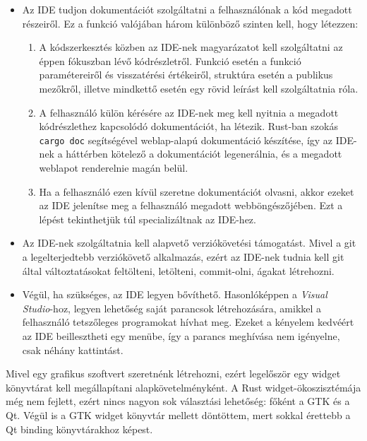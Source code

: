 \begin{itemize}
	\item Az IDE tudjon dokumentációt szolgáltatni a felhasználónak a kód megadott részeiről. 
	Ez a funkció valójában három különböző szinten kell, hogy létezzen:
	\begin{enumerate}
		\item A kódszerkesztés közben az IDE-nek magyarázatot kell szolgáltatni az éppen fókuszban lévő kódrészletről. 
		Funkció esetén a funkció paramétereiről és visszatérési értékeiről, struktúra esetén a publikus mezőkről, illetve mindkettő esetén egy rövid leírást kell szolgáltatnia róla.
		
		\item A felhasználó külön kérésére az IDE-nek meg kell nyitnia a megadott kódrészlethez kapcsolódó dokumentációt, ha létezik. 
		Rust-ban szokás \texttt{cargo doc} segítségével weblap-alapú dokumentáció készítése, így az IDE-nek a háttérben kötelező a dokumentációt legenerálnia, és a megadott weblapot renderelnie magán belül.
		
		\item Ha a felhasználó ezen kívül szeretne dokumentációt olvasni, akkor ezeket az IDE jelenítse meg a felhasználó megadott webböngészőjében. 
		Ezt a lépést tekinthetjük túl specializáltnak az IDE-hez.
	\end{enumerate}
	
	\item Az IDE-nek szolgáltatnia kell alapvető verziókövetési támogatást. 
	Mivel a git a legelterjedtebb verziókövető alkalmazás, ezért az IDE-nek tudnia kell git által változtatásokat feltölteni, letölteni, commit-olni, ágakat létrehozni.
	
	\item Végül, ha szükséges, az IDE legyen bővíthető. 
	Hasonlóképpen a \emph{Visual Studio}-hoz, legyen lehetőség saját parancsok létrehozására, amikkel a felhasználó tetszőleges programokat hívhat meg. 
	Ezeket a kényelem kedvéért az IDE beillesztheti egy menübe, így a parancs meghívása nem igényelne, csak néhány kattintást.
\end{itemize}



Mivel egy grafikus szoftvert szeretnénk létrehozni, ezért legelőször egy widget könyvtárat kell megállapítani alapkövetelményként.
A Rust widget-ökoszisztémája még nem fejlett, ezért nincs nagyon sok választási lehetőség: főként a GTK és a Qt.
Végül is a GTK widget könyvtár mellett döntöttem, mert sokkal érettebb a Qt binding könyvtárakhoz képest.

